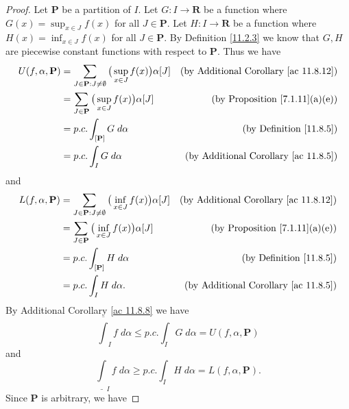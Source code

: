 \begin{proof}
    Let \(\mathbf{P}\) be a partition of \(I\).
    Let \(G : I \to \mathbf{R}\) be a function where \(G(x) = \sup_{x \in J} f(x)\) for all \(J \in \mathbf{P}\).
    Let \(H : I \to \mathbf{R}\) be a function where \(H(x) = \inf_{x \in J} f(x)\) for all \(J \in \mathbf{P}\).
    By Definition \ref{11.2.3} we know that \(G, H\) are piecewise constant functions with respect to \(\mathbf{P}\).
    Thus we have
    \begin{align*}
        U(f, \alpha, \mathbf{P}) & = \sum_{J \in \mathbf{P} : J \neq \emptyset} \big(\sup_{x \in J} f(x)\big) \alpha[J] & \text{(by Additional Corollary \ref{ac 11.8.12})} \\
                                 & = \sum_{J \in \mathbf{P}} \big(\sup_{x \in J} f(x)\big) \alpha[J]                    & \text{(by Proposition \ref{7.1.11}(a)(e))}        \\
                                 & = p.c. \int_{[\mathbf{P}]} G \; d \alpha                                             & \text{(by Definition \ref{11.8.5})}               \\
                                 & = p.c. \int_I G \; d \alpha                                                          & \text{(by Additional Corollary \ref{ac 11.8.5})}
    \end{align*}
    and
    \begin{align*}
        L(f, \alpha, \mathbf{P}) & = \sum_{J \in \mathbf{P} : J \neq \emptyset} \big(\inf_{x \in J} f(x)\big) \alpha[J] & \text{(by Additional Corollary \ref{ac 11.8.12})} \\
                                 & = \sum_{J \in \mathbf{P}} \big(\inf_{x \in J} f(x)\big) \alpha[J]                    & \text{(by Proposition \ref{7.1.11}(a)(e))}        \\
                                 & = p.c. \int_{[\mathbf{P}]} H \; d \alpha                                             & \text{(by Definition \ref{11.8.5})}               \\
                                 & = p.c. \int_I H \; d \alpha.                                                         & \text{(by Additional Corollary \ref{ac 11.8.5})}
    \end{align*}
    By Additional Corollary \ref{ac 11.8.8} we have
    \[
        \overline{\int}_I f \; d \alpha \leq p.c. \int_I G \; d \alpha = U(f, \alpha, \mathbf{P})
    \]
    and
    \[
        \underline{\int}_I f \; d \alpha \geq p.c. \int_I H \; d \alpha = L(f, \alpha, \mathbf{P}).
    \]
    Since \(\mathbf{P}\) is arbitrary, we have

\end{proof}
